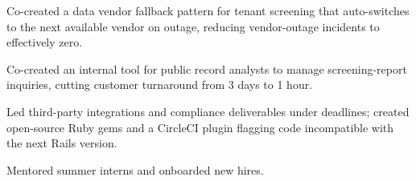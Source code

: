     \begin{tightemize}
      \item Co-created a data vendor fallback pattern for tenant screening that auto-switches to the next available vendor on outage, reducing vendor-outage incidents to effectively zero.
      \item Co-created an internal tool for public record analysts to manage screening-report inquiries, cutting customer turnaround from 3 days to 1 hour.
      \item Led third-party integrations and compliance deliverables under deadlines; created open-source Ruby gems and a CircleCI plugin flagging code incompatible with the next Rails version.
      \item Mentored summer interns and onboarded new hires.
    \end{tightemize} 
    \sectionsep
